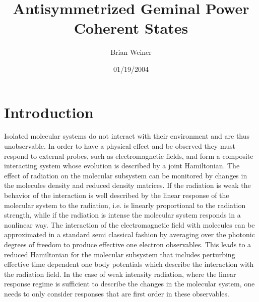 \documentclass[aps,preprint]{revtex4}%
\begin{document}
\preprint{ }
\title[AGP\ Coh. States ]{Antisymmetrized Geminal Power Coherent States}
\author{Brian Weiner}
\keywords{}

\begin{abstract}


\end{abstract}
\date{01/19/2004}
\maketitle
\tableofcontents


\section{Introduction\label{intro}}

Isolated molecular systems do not interact with their environment and are thus
unobservable. In order to have a physical effect and be observed they must
respond to external probes, such as electromagnetic fields, and form a
composite interacting system whose evolution is described by a joint
Hamiltonian. The effect of radiation on the molecular subsystem can be
monitored by changes in the molecules density and reduced density matrices. If
the radiation is weak the behavior of the interaction is well described by the
linear response of the molecular system to the radiation, i.e. is linearly
proportional to the radiation strength, while if the radiation is intense the
molecular system responds in a nonlinear way. The interaction of the
electromagnetic field with molecules can be approximated in a standard semi
classical fashion by averaging over the photonic degrees of freedom to produce
effective one electron observables. This leads to a reduced Hamiltonian for
the molecular subsystem that includes perturbing effective time dependent one
body potentials which describe the interaction with the radiation field. In
the case of weak intensity radiation, where the linear response regime is
sufficient to describe the changes in the molecular system, one needs to only
consider responses that are first order in these observables.
\end{document}
